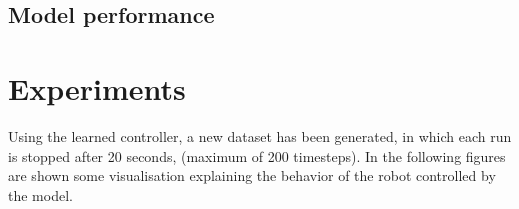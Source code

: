 \documentclass[conference]{IEEEtran}
\begin{document}
\subsection{Model performance}
%
%
%

\section{Experiments}
Using the learned controller, a new dataset has been generated, in which each run is stopped after 20 seconds, (maximum 
of 200 timesteps). 
In the following figures are shown some visualisation explaining the behavior of the robot controlled by the model.
\end{document}
